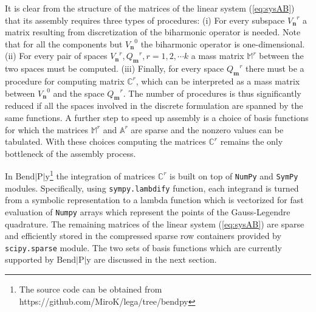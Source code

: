 \documentclass{marine_2015}
\newcommand{\Vh}{\ensuremath{V_{\mathbf{n}}}}
\newcommand{\Qh}{\ensuremath{Q_{\mathbf{m}}}}
\begin{document}
It is clear from the structure of the matrices of the linear system
(\ref{eq:sysAB}) that its assembly requires three types of procedures: (i) For 
every subspace $\Vh^r$ a matrix resulting from discretization of the biharmonic operator is needed.
Note that for all the components but $\Vh^0$ the biharmonic operator is one-dimensional. 
(ii) For every pair of spaces $\Vh^r, \Qh^r, r=1,2,\cdots k$ a mass
matrix $\mathbb{M}^r$ between the two spaces must be computed. (iii) Finally, for
every space $\Qh^r$ there must be a procedure for computing matrix $\mathbb{C}^r$,
which can be interpreted as a mass matrix between $\Vh^0$ and the space
$\Qh^r$. The number of procedures is thus significantly reduced if all the
spaces involved in the discrete formulation are spanned by the same functions. A
further step to speed up assembly is a choice of basis functions for which the
matrices $\mathbb{M}^r$ and $\mathbb{A}^r$ are sparse and the nonzero values can
be tabulated. With these choices computing the matrices $\mathbb{C}^r$ remains the
only bottleneck of the assembly process. 

In $\text{Bend}\!\left|\text{P}\right|\!\text{y}$\footnote{The source code
can be obtained from https://github.com/MiroK/lega/tree/bendpy} the integration of matrices $\mathbb{C}^r$ is built on top of
{\tt{NumPy}}\cite{numpy} and {\tt{SymPy}}\cite{sympy} modules. Specifically, using
{\tt{sympy.lambdify}} function, each integrand is turned from a symbolic representation 
to a lambda function which is vectorized for fast evaluation of {\tt{Numpy}}
arrays which represent the points of the Gauss-Legendre quadrature. The remaining
matrices of the linear system (\ref{eq:sysAB}) are sparse and efficiently stored
in the compressed sparse row containers provided by {\tt{scipy.sparse}} module.
The two sets of basis functions which are currently supported by $\text{Bend}\!\left|\text{P}\right|\!\text{y}$
are discussed in the next section.
\end{document}
